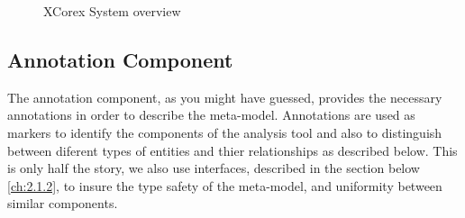         \begin{figure}
        \centering
        \caption{XCorex System overview \cite{oldThesis}}
        \label{fig:XCoreSystem}
        \end{figure}

\subsection{Annotation Component}\label{ch:2.1.1}
        
        The annotation component, as you might have guessed, provides the necessary annotations in order to describe the meta-model.
Annotations are used as markers to identify the components of the analysis tool and also to distinguish between diferent types of entities and thier relationships as described below.
This is only half the story, we also use interfaces, described in the section below \ref{ch:2.1.2}, to insure the type safety of the meta-model, and uniformity 
between similar components.

